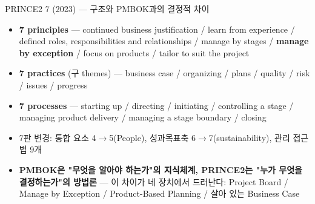 \begin{frame}[allowframebreaks=1.0]{PRINCE2 7 (2023) — 구조와 PMBOK과의 결정적 차이}
\small
\begin{itemize}
\item\relax \textbf{7 principles} — continued business justification / learn from experience / defined roles, responsibilities and relationships / manage by stages / \textbf{manage by exception} / focus on products / tailor to suit the project
\item\relax \textbf{7 practices} (구 themes) — business case / organizing / plans / quality / risk / issues / progress
\item\relax \textbf{7 processes} — starting up / directing / initiating / controlling a stage / managing product delivery / managing a stage boundary / closing
\item\relax 7판 변경: 통합 요소 4$\rightarrow$5(People), 성과목표축 6$\rightarrow$7(sustainability), 관리 접근법 9개
\item\relax \textbf{PMBOK은 "무엇을 알아야 하는가"의 지식체계, PRINCE2는 "누가 무엇을 결정하는가"의 방법론} — 이 차이가 네 장치에서 드러난다: Project Board / Manage by Exception / Product-Based Planning / 살아 있는 Business Case
\end{itemize}
\end{frame}

